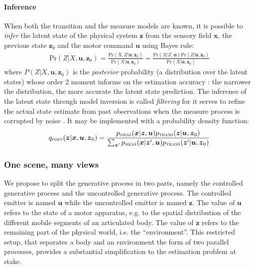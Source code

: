 \documentclass[12pt,twoside,openright]{article}
\begin{document}
\paragraph{Inference}

When both the transition and the measure models are known, it is possible to \emph{infer} the latent state of the physical system $\boldsymbol{z}$ from the sensory field $\boldsymbol{x}$, the previous state $\boldsymbol{z}_0$ and the motor command $\boldsymbol{u}$ using Bayes rule:
\begin{align}
\text{Pr}(Z|X,\boldsymbol{u},\boldsymbol{z}_0) = \frac{\text{Pr}(X,Z|\boldsymbol{u},\boldsymbol{z}_0)}{\text{Pr}(X|\boldsymbol{u},\boldsymbol{z}_0)} %
= \frac{\text{Pr}(X|Z,\boldsymbol{u}) \text{Pr}(Z|\boldsymbol{u},\boldsymbol{z}_0)}
{\text{Pr}(X|\boldsymbol{u},\boldsymbol{z}_0)}\label{eq:post-Pr}
\end{align}
where $P(Z|X,\boldsymbol{u},\boldsymbol{z}_0)$ is the \emph{posterior} probability (a distribution over the latent states) whose order 2 moment informs on the estimation accuracy : the narrower the distribution, the more accurate the latent state prediction. 
The inference of the latent state through model inversion is called \emph{filtering} for it serves to refine the actual state estimate from past observations when the measure process is corrupted by noise \cite{Kalman1960}.
It may be implemented with a probability density function:
\begin{align}
q_\text{\sc post}(\boldsymbol{z}|\boldsymbol{x},\boldsymbol{u}, \boldsymbol{z}_0) 
= \frac{p_\text{\sc meas}(\boldsymbol{x}|\boldsymbol{z},\boldsymbol{u}) p_\text{\sc trans}(\boldsymbol{z}|\boldsymbol{u},\boldsymbol{z}_0)}
{\sum_{\boldsymbol{z}'}p_\text{\sc meas}(\boldsymbol{x}|\boldsymbol{z}',\boldsymbol{u}) p_\text{\sc trans}(\boldsymbol{z}'|\boldsymbol{u},\boldsymbol{z}_0)}\label{eq:post-pdf}
\end{align}


\subsubsection{One scene, many views}

We propose to split the generative process in two parts, namely the controlled generative process and the uncontrolled generative process. The controlled emitter is named $\boldsymbol{u}$ while the uncontrolled emitter is named $\boldsymbol{z}$. The value of $\boldsymbol{u}$ refers to the state of a motor apparatus, e.g. to the spatial distribution of the different mobile segments of an articulated body. The value of $\boldsymbol{z}$ refers to the remaining part of the physical world, i.e. the ``environment''. This restricted setup, that separates a body and an environment the form of two parallel processes,  provides a substantial simplification to the estimation problem at stake.  	
\end{document}

